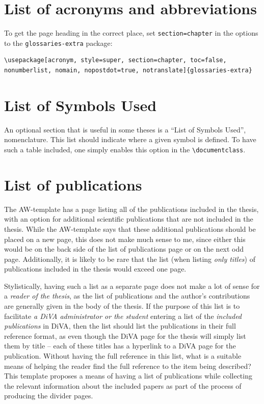 \documentclass[12pt, twoside]{article}
\begin{document}
\section{List of acronyms and abbreviations}
To get the page heading in the correct place, set \texttt{section=chapter} in the options to the \texttt{glossaries-extra} package:
\begin{lstlisting}[style=latexExampleForAuthors]
\usepackage[acronym, style=super, section=chapter, toc=false, nonumberlist, nomain, nopostdot=true, notranslate]{glossaries-extra}\end{lstlisting}

\section{List of Symbols Used}

An optional section that is useful in some theses is a \enquote{List of Symbols Used}, \ie nomenclature. This list should indicate where a given symbol is defined. To have such a table included, one simply enables this option in the \texttt{\textbackslash documentclass}.

\section{List of publications}
\label{sec:cycle3ListOfPublications}

The AW-template has a page listing all of the publications included in the thesis, with an option for additional scientific publications that are not included in the thesis. While the AW-template says that these additional publications should be placed on a new page, this does not make much sense to me, since either this would be on the back side of the list of publications page or on the next odd page. Additionally, it is likely to be rare that the list (when listing \textit{only titles}) of publications included in the thesis would exceed one page.

Stylistically, having such a list as a separate page does not make a lot of sense for a \textit{reader of the thesis}, as the list of publications and the author's contributions are generally given in the body of the thesis. If the purpose of this list is to facilitate \textit{a \gls{DiVA} administrator or the student} entering a list of the \textit{included publications} in \gls{DiVA}, then the list should list the publications in their full reference format, as even though the \gls{DiVA} page for the thesis will simply list them by title -- each of these titles has a hyperlink to a \gls{DiVA} page for the publication. Without having the full reference in this list, what is a suitable means of helping the reader find the full reference to the item being described? This template proposes a means of having a list of publications while collecting the relevant information about the included papers as part of the process of producing the divider pages.
\end{document}
